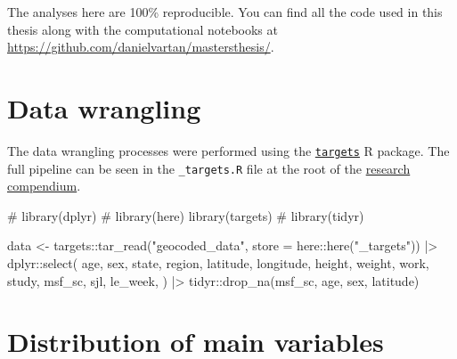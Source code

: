 \documentclass[
  12pt,
  a4paper,
  oneside]{tesesusp}
\newenvironment{Shaded}{\begin{snugshade}}{\end{snugshade}}
\newcommand{\AttributeTok}[1]{\textcolor[rgb]{0.40,0.45,0.13}{#1}}
\newcommand{\CommentTok}[1]{\textcolor[rgb]{0.37,0.37,0.37}{#1}}
\newcommand{\FunctionTok}[1]{\textcolor[rgb]{0.28,0.35,0.67}{#1}}
\newcommand{\NormalTok}[1]{\textcolor[rgb]{0.00,0.23,0.31}{#1}}
\newcommand{\OtherTok}[1]{\textcolor[rgb]{0.00,0.23,0.31}{#1}}
\newcommand{\SpecialCharTok}[1]{\textcolor[rgb]{0.37,0.37,0.37}{#1}}
\newcommand{\StringTok}[1]{\textcolor[rgb]{0.13,0.47,0.30}{#1}}
\begin{document}
The analyses here are 100\% reproducible. You can find all the code used
in this thesis along with the computational notebooks at
\url{https://github.com/danielvartan/mastersthesis/}.

\hypertarget{data-wrangling}{%
\section{Data wrangling}\label{data-wrangling}}

The data wrangling processes were performed using the
\href{https://github.com/ropensci/targets}{\texttt{targets}} R package.
The full pipeline can be seen in the \texttt{\_targets.R} file at the
root of the
\href{https://github.com/danielvartan/mastersthesis}{research
compendium}.

\begin{Shaded}
\begin{Highlighting}[numbers=left,,]
\CommentTok{\# library(dplyr)}
\CommentTok{\# library(here)}
\FunctionTok{library}\NormalTok{(targets)}
\CommentTok{\# library(tidyr)}

\NormalTok{data }\OtherTok{\textless{}{-}} 
\NormalTok{  targets}\SpecialCharTok{::}\FunctionTok{tar\_read}\NormalTok{(}\StringTok{"geocoded\_data"}\NormalTok{, }\AttributeTok{store =}\NormalTok{ here}\SpecialCharTok{::}\FunctionTok{here}\NormalTok{(}\StringTok{"\_targets"}\NormalTok{)) }\SpecialCharTok{|\textgreater{}}
\NormalTok{  dplyr}\SpecialCharTok{::}\FunctionTok{select}\NormalTok{(}
\NormalTok{    age, sex, state, region, latitude, longitude, height, weight, work, study,}
\NormalTok{    msf\_sc, sjl, le\_week, }
\NormalTok{    ) }\SpecialCharTok{|\textgreater{}}
\NormalTok{  tidyr}\SpecialCharTok{::}\FunctionTok{drop\_na}\NormalTok{(msf\_sc, age, sex, latitude)}
\end{Highlighting}
\end{Shaded}

\hypertarget{distribution-of-main-variables}{%
\section{Distribution of main
variables}\label{distribution-of-main-variables}}
\end{document}
